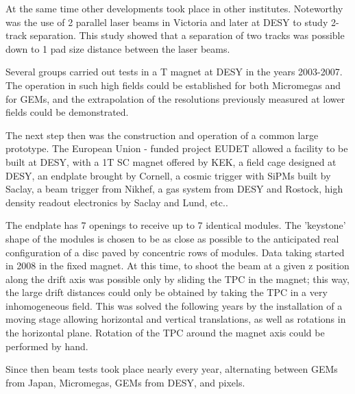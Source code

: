At the same time other developments took place in other institutes. Noteworthy was the use of 2 parallel laser beams in Victoria and later at DESY to study 2-track separation. This study showed that a separation of two tracks was possible down to 1 pad size distance between the laser beams.

Several groups carried out tests in a \unit[5]{T} magnet at DESY in the years 2003-2007. The operation in such high fields could be established for both Micromegas and for GEMs, and the extrapolation of the resolutions previously measured at lower fields could be demonstrated.

The next step then was the construction and operation of a common large prototype. The European Union - funded project EUDET allowed a facility to be built at DESY, with a 1T SC magnet offered by KEK, a field cage designed at DESY, an endplate brought by Cornell, a cosmic trigger with SiPMs built by Saclay, a beam trigger from Nikhef, a gas system from DESY and Rostock, high density readout electronics by Saclay and Lund, etc..

The endplate has 7 openings to receive up to 7 identical modules. The 'keystone' shape of the modules is chosen to be as close as possible to the anticipated real configuration of a disc paved by concentric rows of modules. Data taking started in 2008 in the fixed magnet. At this time, to shoot the beam at a given z position along the drift axis was possible only by sliding the TPC in the  magnet; this way, the large drift distances could only be obtained by taking the TPC in a very inhomogeneous field. This was solved the following years by the installation of a moving stage allowing horizontal and vertical translations, as well as rotations in the horizontal plane. Rotation of the TPC around the  magnet axis could be performed by hand.

Since then beam tests took place nearly every year, alternating between GEMs from Japan, Micromegas, GEMs from DESY, and pixels.

%
%







% 
